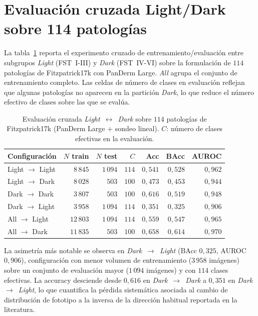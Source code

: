\section{Evaluación cruzada Light/Dark sobre 114 patologías}
\label{sec:anexob-cross-114}

La tabla~\ref{tab:anexob-cross114} reporta el experimento cruzado
de entrenamiento/evaluación entre subgrupos \emph{Light} (FST~I-III)
y \emph{Dark} (FST~IV-VI) sobre la formulación de $114$
patologías de Fitzpatrick17k con PanDerm Large. \emph{All} agrupa
el conjunto de entrenamiento completo. Las celdas de número de
clases en evaluación reflejan que algunas patologías no aparecen
en la partición \emph{Dark}, lo que reduce el número efectivo de
clases sobre las que se evalúa.

\begin{table}[H]
\centering
\footnotesize
\setlength{\tabcolsep}{4pt}
\renewcommand{\arraystretch}{0.95}
\caption{Evaluación cruzada \emph{Light}~$\leftrightarrow$~\emph{Dark}
sobre $114$ patologías de Fitzpatrick17k (PanDerm Large + sondeo
lineal). $C$: número de clases efectivas en la evaluación.}
\label{tab:anexob-cross114}
\begin{tabular}{lrrrrrr}
\hline
Configuración   & $N$ train & $N$ test & $C$ & Acc       & BAcc      & AUROC \\
\hline
Light $\to$ Light & $8\,845$ & $1\,094$ & $114$ & $0{,}541$ & $0{,}528$ & $0{,}962$ \\
Light $\to$ Dark  & $8\,028$ & $503$    & $100$ & $0{,}473$ & $0{,}453$ & $0{,}944$ \\
Dark $\to$ Dark   & $3\,807$ & $503$    & $100$ & $0{,}616$ & $0{,}519$ & $0{,}948$ \\
Dark $\to$ Light  & $3\,958$ & $1\,094$ & $114$ & $0{,}351$ & $0{,}325$ & $0{,}906$ \\
All $\to$ Light   & $12\,803$& $1\,094$ & $114$ & $0{,}559$ & $0{,}547$ & $0{,}965$ \\
All $\to$ Dark    & $11\,835$& $503$    & $100$ & $0{,}658$ & $0{,}614$ & $0{,}970$ \\
\hline
\end{tabular}
\end{table}

La asimetría más notable se observa en \emph{Dark}~$\to$~\emph{Light}
(BAcc $0{,}325$, AUROC $0{,}906$), configuración con menor
volumen de entrenamiento ($3\,958$ imágenes) sobre un conjunto
de evaluación mayor ($1\,094$ imágenes) y con $114$ clases
efectivas. La accuracy desciende desde $0{,}616$ en
\emph{Dark}~$\to$~\emph{Dark} a $0{,}351$ en
\emph{Dark}~$\to$~\emph{Light}, lo que cuantifica la pérdida
sistemática asociada al cambio de distribución de fototipo a la
inversa de la dirección habitual reportada en la literatura.

